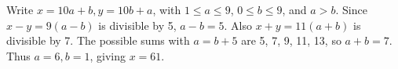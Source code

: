 Write $x=10a+b,y=10b+a$, with $1\le a\le9$, $0\le b\le9$, and $a>b$. Since $x-y=9(a-b)$ is divisible by 5, $a-b=5$. Also $x+y=11(a+b)$ is divisible by 7. The possible sums with $a=b+5$ are 5, 7, 9, 11, 13, so $a+b=7$. Thus $a=6,b=1$, giving $\boxed{x=61}$.
